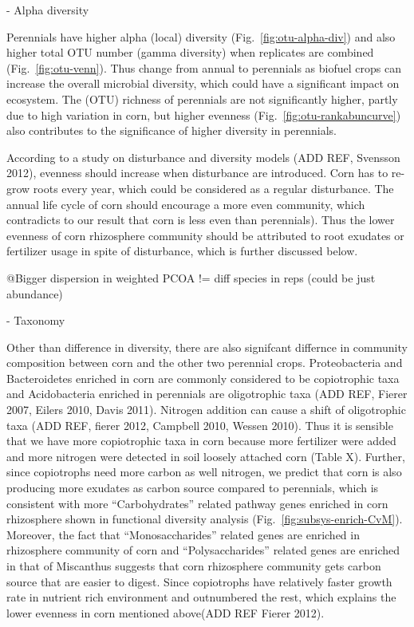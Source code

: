 \documentclass[12pt]{article}
\begin{document}
- Alpha diversity

Perennials have higher alpha (local) diversity (Fig.~\ref{fig:otu-alpha-div}) and also higher total OTU number (gamma diversity) when replicates are combined (Fig.~\ref{fig:otu-venn}). Thus change from annual to perennials as biofuel crops can increase the overall microbial diversity, which could have a significant impact on ecosystem. The (OTU) richness of perennials are not significantly higher, partly due to high variation in corn, but higher evenness (Fig.~\ref{fig:otu-rankabuncurve}) also contributes to the significance of higher diversity in perennials. 

According to a study on disturbance and diversity models (ADD REF, Svensson 2012), evenness should increase when disturbance are introduced. Corn has to re-grow roots every year, which could be considered as a regular disturbance. The annual life cycle of corn should encourage a more even community, which contradicts to our result that corn is less even than perennials). Thus the lower evenness of corn rhizosphere community should be attributed to root exudates or fertilizer usage in spite of disturbance, which is further discussed below.

@Bigger dispersion in weighted PCOA != diff species in reps (could be just abundance)

- Taxonomy

Other than difference in diversity, there are also signifcant differnce in community composition between corn and the other two perennial crops. Proteobacteria and Bacteroidetes enriched in corn are commonly considered to be copiotrophic taxa and Acidobacteria enriched in perennials are oligotrophic taxa (ADD REF, Fierer 2007, Eilers 2010, Davis 2011). Nitrogen addition can cause a shift of oligotrophic taxa (ADD REF, fierer 2012, Campbell 2010, Wessen 2010). Thus it is sensible that we have more copiotrophic taxa in corn because more fertilizer were added and more nitrogen were detected in soil loosely attached corn (Table X). Further, since copiotrophs need more carbon as well nitrogen, we predict that corn is also producing more exudates as carbon source compared to perennials, which is consistent with more ``Carbohydrates'' related pathway genes enriched in corn rhizosphere shown in functional diversity analysis (Fig.~\ref{fig:subsys-enrich-CvM}). Moreover, the fact that ``Monosaccharides'' related genes are enriched in rhizosphere community of corn and ``Polysaccharides'' related genes are enriched in that of Miscanthus suggests that corn rhizosphere community gets carbon source that are easier to digest. Since copiotrophs have relatively faster growth rate in nutrient rich environment and outnumbered the rest, which explains the lower evenness in corn mentioned above(ADD REF Fierer 2012).
\end{document}
